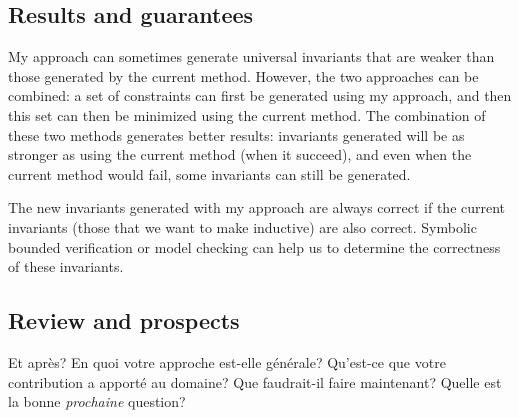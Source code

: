 \documentclass{article}
\newenvironment{point}[1]%
{\subsection*{#1}}%
{}
\begin{document}
\begin{point}{Results and guarantees}

  My approach can sometimes generate universal invariants that are weaker than those generated by the current
  method. However, the two approaches can be combined: a set of constraints can first be generated using my approach,
  and then this set can then be minimized using the current method. The combination of these two methods
  generates better results: invariants generated will be as stronger as using the current method (when it succeed),
  and even when the current method would fail, some invariants can still be generated.

  The new invariants generated with my approach are always correct if the current invariants (those that we want to make inductive)
  are also correct. Symbolic bounded verification or model checking can help us to determine the correctness of these invariants.

\end{point}


\begin{point}{Review and prospects}
  
  Et après? En quoi votre approche est-elle générale? Qu'est-ce que
  votre contribution a apporté au domaine? Que faudrait-il faire
  maintenant? Quelle est la bonne \emph{prochaine} question?

\end{point}
\end{document}
